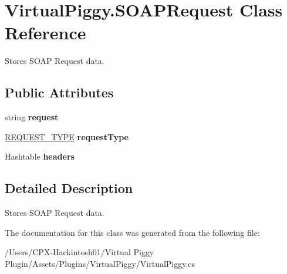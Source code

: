 \hypertarget{class_virtual_piggy_1_1_s_o_a_p_request}{\section{Virtual\-Piggy.\-S\-O\-A\-P\-Request Class Reference}
\label{class_virtual_piggy_1_1_s_o_a_p_request}
}


Stores S\-O\-A\-P Request data.  


\subsection*{Public Attributes}
\begin{DoxyCompactItemize}
\item 
\hypertarget{class_virtual_piggy_1_1_s_o_a_p_request_aadb6951b6e40c08a758b2fc69bb16771}{string {\bfseries request}}\label{class_virtual_piggy_1_1_s_o_a_p_request_aadb6951b6e40c08a758b2fc69bb16771}

\item 
\hypertarget{class_virtual_piggy_1_1_s_o_a_p_request_a6241a2e66694a8a9509cd96e65c8b369}{\hyperlink{class_virtual_piggy_adca55d9dcf3fd7482dacac0ec3258afd}{R\-E\-Q\-U\-E\-S\-T\-\_\-\-T\-Y\-P\-E} {\bfseries request\-Type}}\label{class_virtual_piggy_1_1_s_o_a_p_request_a6241a2e66694a8a9509cd96e65c8b369}

\item 
\hypertarget{class_virtual_piggy_1_1_s_o_a_p_request_aa05beab351aef8cc9ca04f09a8c6ce51}{Hashtable {\bfseries headers}}\label{class_virtual_piggy_1_1_s_o_a_p_request_aa05beab351aef8cc9ca04f09a8c6ce51}

\end{DoxyCompactItemize}


\subsection{Detailed Description}
Stores S\-O\-A\-P Request data. 



The documentation for this class was generated from the following file\-:\begin{DoxyCompactItemize}
\item 
/\-Users/\-C\-P\-X-\/\-Hackintosh01/\-Virtual Piggy Plugin/\-Assets/\-Plugins/\-Virtual\-Piggy/Virtual\-Piggy.\-cs\end{DoxyCompactItemize}
